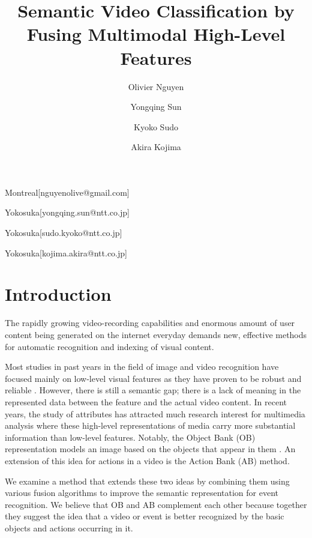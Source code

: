 \documentclass[MIRU]{miru2015e}
\begin{document}
\title{Semantic Video Classification by Fusing Multimodal High-Level Features}


\author{Olivier Nguyen}{Montreal}[nguyenolive@gmail.com]%
\author{Yongqing Sun}{Yokosuka}[yongqing.sun@ntt.co.jp]%
\author{Kyoko Sudo}{Yokosuka}[sudo.kyoko@ntt.co.jp]%
\author{Akira Kojima}{Yokosuka}[kojima.akira@ntt.co.jp]%


\maketitle

\section{Introduction}
The rapidly growing video-recording capabilities and enormous amount of user content being generated on the internet everyday demands new, effective methods for automatic recognition and indexing of visual content.

Most studies in past years in the field of image and video recognition have focused mainly on low-level visual features as they have proven to be robust and reliable \cite{liobjectbank}. However, there is still a semantic gap; there is a lack of meaning in the represented data between the feature and the actual video content. In recent years, the study of attributes has attracted much research interest for multimedia analysis where these high-level representations of media carry more substantial information than low-level features. Notably, the Object Bank (OB) representation models an image based on the objects that appear in them \cite{liobjectbank}. An extension of this idea for actions in a video is the Action Bank (AB) method. 

We examine a method that extends these two ideas by combining them using various fusion algorithms to improve the semantic representation for event recognition. We believe that OB and AB complement each other because together they suggest the idea that a video or event is better recognized by the basic objects and actions occurring in it. %
\end{document}
